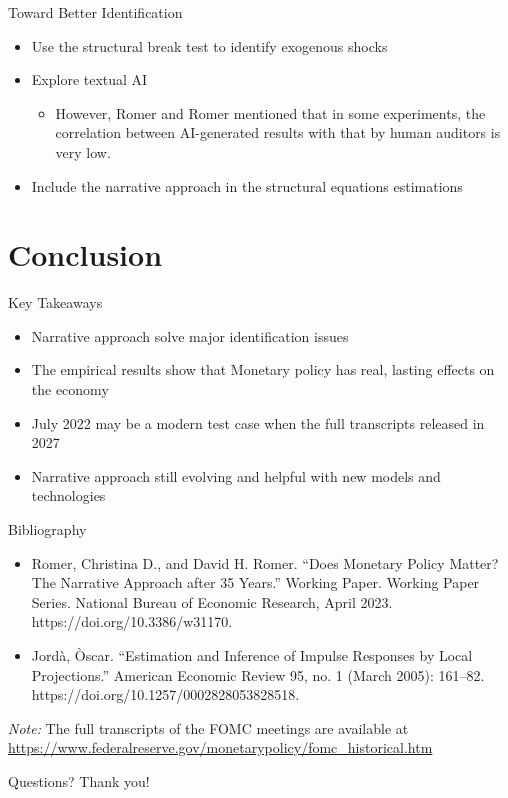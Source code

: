 \documentclass{beamer}
\begin{document}
\begin{frame}{Toward Better Identification}
  \begin{itemize}
    \item Use the structural break test to identify exogenous shocks
    \item Explore textual AI 
    \begin{itemize}
        \item However, Romer and Romer mentioned that in some experiments, the correlation between AI-generated results with that by human auditors is very low.
    \end{itemize}
    \item Include the narrative approach in the structural equations estimations
  \end{itemize}
\end{frame}

\section{Conclusion}

\begin{frame}{Key Takeaways}
  \begin{itemize}
    \item Narrative approach solve major identification issues
    \item The empirical results show that Monetary policy has real, lasting effects on the economy
    \item July 2022 may be a modern test case when the full transcripts released in 2027
    \item Narrative approach still evolving and helpful with new models and technologies
  \end{itemize}
\end{frame}
\begin{frame}{Bibliography}
  \begin{itemize}
    \item Romer, Christina D., and David H. Romer. “Does Monetary Policy Matter? The Narrative Approach after 35 Years.” Working Paper. Working Paper Series. National Bureau of Economic Research, April 2023. https://doi.org/10.3386/w31170.
    \item Jordà, Òscar. “Estimation and Inference of Impulse Responses by Local Projections.” American Economic Review 95, no. 1 (March 2005): 161–82. https://doi.org/10.1257/0002828053828518.
  \end{itemize}
  \vspace{1em}
  \textit{Note:} The full transcripts of the FOMC meetings are available at \url{https://www.federalreserve.gov/monetarypolicy/fomc_historical.htm}
\end{frame}
\begin{frame}{Questions?}
  \centering
  \Large Thank you! \\
  \vspace{1em}
\end{frame}
\end{document}
